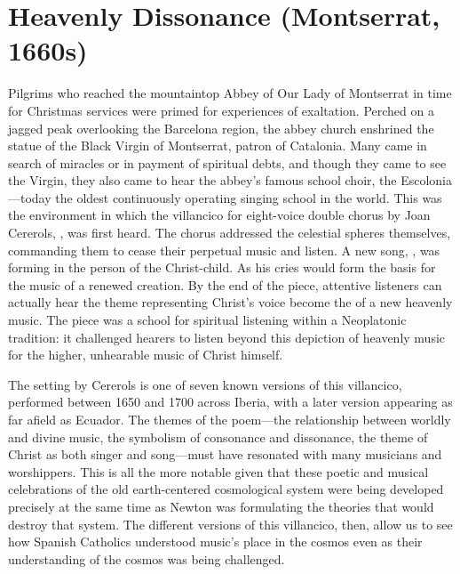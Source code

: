 
% 
% 
%

\chapter{Heavenly Dissonance (Montserrat, 1660s)}
\label{ch:cererols-suspended}

Pilgrims who reached the mountaintop Abbey of Our Lady of Montserrat in time for
Christmas services were primed for experiences of exaltation.
Perched on a jagged peak overlooking the Barcelona region, the abbey church
enshrined the statue of the Black Virgin of Montserrat, patron of Catalonia.
Many came in search of miracles or in payment of spiritual debts, and though
they came to see the Virgin, they also came to hear the abbey's famous school
choir, the Escolonia---today the oldest continuously operating singing school in
the world.
This was the environment in which the villancico for eight-voice double chorus
by Joan Cererols, , was first
heard.%
The chorus addressed the celestial spheres themselves, commanding them to cease
their perpetual music and listen.
A new song, , was forming in the person of the
Christ-child. 
As  his cries would form the basis for the music of a
renewed creation.
By the end of the piece, attentive listeners can actually hear the theme
representing Christ's voice become the  of a new heavenly
music. 
The piece was a school for spiritual listening within a Neoplatonic tradition:
it challenged hearers to listen beyond this depiction of heavenly music for the
higher, unhearable music of Christ himself.

The setting by Cererols is one of seven known versions of this villancico,
performed between 1650 and 1700 across Iberia, with a later version appearing as
far afield as Ecuador.
The themes of the poem---the relationship between worldly and divine music, the
symbolism of consonance and dissonance, the theme of Christ as both singer and
song---must have resonated with many musicians and worshippers.
This is all the more notable given that these poetic and musical celebrations of
the old earth-centered cosmological system were being developed precisely at the
same time as Newton was formulating the theories that would destroy that system.
The different versions of this villancico, then, allow us to see how Spanish
Catholics understood music's place in the cosmos even as their understanding of
the cosmos was being challenged.

